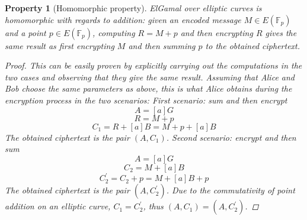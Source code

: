 \documentclass{report}
\newtheorem{property}{Property}
\begin{document}
\begin{property}[Homomorphic property]
ElGamal over elliptic curves is homomorphic with regards to addition: given an encoded message $M \in E(\mathds{F}_p)$ and a point $p \in E(\mathds{F}_p)$, computing $R=M+p$ and
then encrypting $R$ gives the same result as first encrypting $M$ and then summing $p$ to the obtained ciphertext. 
\begin{proof}
This can be easily proven by explicitly carrying out the computations in the two cases and observing that they give the same result. Assuming that Alice and Bob choose the same parameters 
as above, this is what Alice obtains during the encryption process in the two scenarios:
\newline \newline
\textit{First scenario: sum and then encrypt}
$$A=[a]G$$
$$R=M+p$$
$$C_1=R+[a]B=M+p+[a]B$$ 
The obtained ciphertext is the pair $(A, C_1)$.
\newline \newline
\textit{Second scenario: encrypt and then sum}
$$A=[a]G$$
$$C_2=M+[a]B$$
$$C_2^{'}=C_2+p=M+[a]B+p$$
The obtained ciphertext is the pair $(A, C_2^{'})$.
\newline \newline
Due to the commutativity of point addition on an elliptic curve, $C_1=C_2^{'}$, thus $(A, C_1)=(A, C_2^{'})$.
\end{proof}
\end{property}
\end{document}
